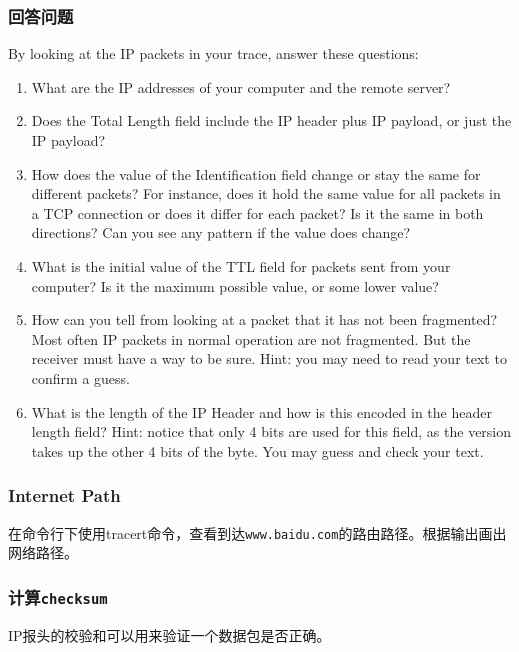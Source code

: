 \documentclass{article}
\begin{document}
\subsubsection{回答问题}

By looking at the IP packets in your trace, answer these questions:

\begin{enumerate}[noitemsep]

  \item What are the IP addresses of your computer and the remote server?
  \item Does the Total Length field include the IP header plus IP payload, or just the IP payload?
  \item How does the value of the Identification field change or stay the same for different packets? For instance, does it hold the same value for all packets in a TCP connection or does it differ for each packet? Is it the same in both directions? Can you see any pattern if the value does change?
  \item What is the initial value of the TTL field for packets sent from your computer? Is it the maximum possible value, or some lower value?
  \item How can you tell from looking at a packet that it has not been fragmented? Most often IP packets in normal operation are not fragmented. But the receiver must have a way to be sure. Hint: you may need to read your text to confirm a guess.
  \item What is the length of the IP Header and how is this encoded in the header length field? Hint: notice that only 4 bits are used for this field, as the version takes up the other 4 bits of the byte. You may guess and check your text.

\end{enumerate}

\subsubsection{Internet Path}

在命令行下使用tracert命令，查看到达\texttt{www.baidu.com}的路由路径。根据输出画出网络路径。

\subsubsection{计算\texttt{checksum}}

IP报头的校验和可以用来验证一个数据包是否正确。
\end{document}
